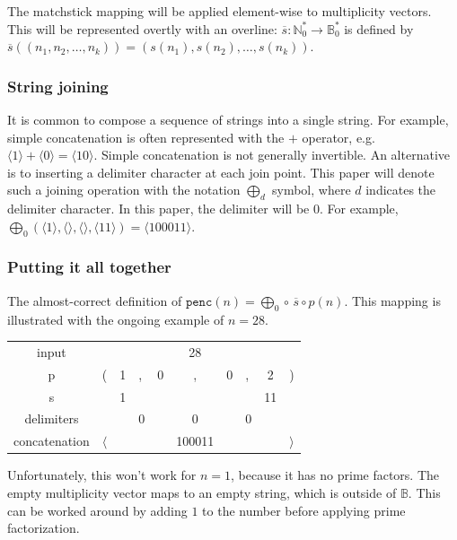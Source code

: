 \documentclass[12pt,reqno]{article}
\begin{document}
The matchstick mapping will be applied element-wise to multiplicity vectors. This will be represented overtly with an overline: $\overline{s} : \mathbb{N}_0^{*} \rightarrow \mathbb{B}_0^{*}$ is defined by $\overline{s}((n_1, n_2, \ldots, n_k)) = (s(n_1), s(n_2), \ldots, s(n_k))$.

\subsubsection{String joining}

It is common to compose a sequence of strings into a single string. For example, simple concatenation is often represented with the $+$ operator, e.g. $\langle 1 \rangle + \langle 0 \rangle = \langle 10 \rangle$. Simple concatenation is not generally invertible. An alternative is to inserting a delimiter character at each join point. This paper will denote such a joining operation with the notation $\bigoplus_d$ symbol, where $d$ indicates the delimiter character. In this paper, the delimiter will be $0$. For example, $\bigoplus_0 (\langle 1 \rangle, \langle \rangle, \langle \rangle, \langle 11 \rangle) = \langle 100011 \rangle$. 

\subsubsection{Putting it all together}

The almost-correct definition of $\texttt{penc}(n) = \bigoplus_0 \circ \, \overline{s} \circ p(n)$. This mapping is illustrated with the ongoing example of $n = 28$.
\begin{center} \begin{tabular}{ |c| l cl cc cl c r| } 
  \hline
    input                &                &    &    &     &   28     &     &    &      &  \\
    p                      &       (        & 1 & ,  & 0 & ,           & 0  & ,  &  2  & ) \\
  \hline
    s                      &                 & 1 &    &    &             &     &    & 11  & \\ 
    delimiters        &                 &    & 0 &    &    0       &     & 0 &      & \\
  \hline
    concatenation & $\langle$ &    &     &   & 100011 &    &     &      & $\rangle$ \\
  \hline
\end{tabular} \end{center}
Unfortunately, this won't work for $n=1$, because it has no prime factors. The empty multiplicity vector maps to an empty string, which is outside of $\mathbb{B}$. This can be worked around by adding $1$ to the number before applying prime factorization.
\end{document}

